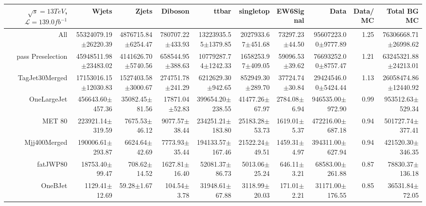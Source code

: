  \begin{tabular}{ r ||  r  r  r  r  r  r || r r r |} 
 \ensuremath{\sqrt{s}=13 TeV}, \ensuremath{\mathcal{L}=139.0 fb^{-1}}  & Wjets & Zjets & Diboson & ttbar & singletop & EW6Signal& Data & Data/MC & Total BG MC \tabularnewline 
 \hline 
All & 55324079.19$\pm$26220.39 & 4876715.84$\pm$6254.47 & 780707.22$\pm$433.93 & 13223935.55$\pm$1379.85 & 2027933.67$\pm$451.68 & 73297.23$\pm$44.50 & 95607223.00$\pm$9777.89 & 1.25 & 76306668.71$\pm$26998.62\tabularnewline \hline 
pass Preselection & 45948511.98$\pm$23483.02 & 4141626.70$\pm$5740.56 & 658544.95$\pm$388.63 & 10779287.74$\pm$1242.33 & 1658253.97$\pm$409.05 & 59096.53$\pm$39.62 & 76693252.00$\pm$8757.47 & 1.21 & 63245321.88$\pm$24213.01\tabularnewline \hline 
TagJet30Merged & 17153016.15$\pm$12030.83 & 1527403.58$\pm$3000.67 & 274751.78$\pm$241.29 & 6212629.30$\pm$942.65 & 852949.30$\pm$289.70 & 37724.74$\pm$30.84 & 29424546.00$\pm$5424.44 & 1.13 & 26058474.86$\pm$12440.92\tabularnewline \hline 
OneLargeJet & 456643.60$\pm$457.36 & 35082.45$\pm$81.56 & 17871.04$\pm$52.83 & 399654.20$\pm$238.55 & 41477.26$\pm$67.97 & 2784.08$\pm$6.94 & 946535.00$\pm$972.90 & 0.99 & 953512.63$\pm$529.34\tabularnewline \hline 
MET 80 & 223921.14$\pm$319.59 & 7675.53$\pm$46.12 & 9077.57$\pm$38.44 & 234251.21$\pm$183.80 & 25183.28$\pm$53.73 & 1619.01$\pm$5.37 & 472216.00$\pm$687.18 & 0.94 & 501727.74$\pm$377.41\tabularnewline \hline 
Mjj400Merged & 190006.61$\pm$293.87 & 6624.64$\pm$42.69 & 7773.93$\pm$35.44 & 194133.57$\pm$167.46 & 21522.24$\pm$49.51 & 1459.31$\pm$4.97 & 394311.00$\pm$627.94 & 0.94 & 421520.30$\pm$346.35\tabularnewline \hline 
fatJWP80 & 18753.40$\pm$99.47 & 708.62$\pm$14.52 & 1627.81$\pm$16.40 & 52081.37$\pm$86.73 & 5013.06$\pm$25.24 & 646.11$\pm$3.21 & 68583.00$\pm$261.88 & 0.87 & 78830.37$\pm$136.18\tabularnewline \hline 
OneBJet & 1129.41$\pm$12.69 & 59.28$\pm$1.67 & 104.54$\pm$3.78 & 31948.61$\pm$67.88 & 3118.99$\pm$20.03 & 171.01$\pm$2.21 & 31171.00$\pm$176.55 & 0.85 & 36531.84$\pm$72.05\tabularnewline \hline 
\end{tabular}
